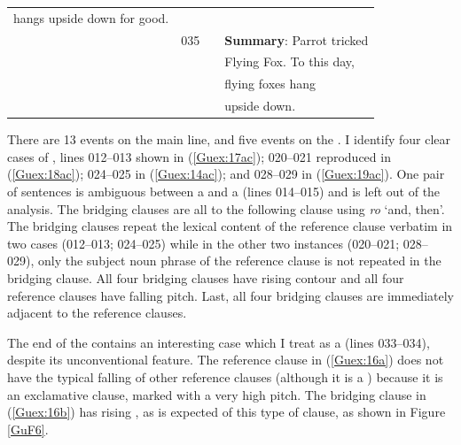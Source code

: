 \documentclass[output=paper]{LSP/langsci}
\begin{document}
{\begin{longtable}{llll}
hangs upside down for good.                   &                   &                 &                                              \\
                                               & 035               &                 & \textbf{Summary}:  Parrot tricked                     \\
                                                 &                   &                 & Flying Fox. To this day,                  \\
                                              &                   &                 &  flying foxes hang       \\
                                              &                   &                 &        upside   down.                  \\
\end{longtable}}



There are 13 events on the main line, and five events on the . I identify four clear cases of , lines 012--013  shown in (\ref{Guex:17ac}); 020--021 reproduced in (\ref{Guex:18ac}); 024--025 in (\ref{Guex:14ac}); and 028--029 in (\ref{Guex:19ac}). One pair of sentences is ambiguous between a  and a  (lines 014--015) and is left out of the analysis.  The bridging clauses are all  to the following clause using \textit{ro} `and, then'.  The bridging clauses repeat the lexical content of the reference clause verbatim in two cases (012--013; 024--025) while in the other two instances (020--021; 028--029), only the subject noun phrase of the reference clause is not repeated in the bridging clause. All four bridging clauses have rising  contour and all four reference clauses have falling pitch. Last, all four bridging clauses are immediately adjacent to the reference clauses. 

The end of the  contains an interesting case which I treat as a  (lines 033--034), despite its unconventional feature. The reference clause in (\ref{Guex:16a}) does not have the typical falling  of other reference clauses (although it is a ) because it is  an exclamative clause, marked with a very high pitch. The bridging clause in (\ref{Guex:16b}) has rising , as is expected of this type of clause, as shown in Figure \ref{GuF6}.
\end{document}
